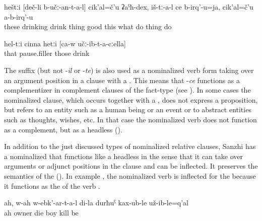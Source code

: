 \begin{exe}
	\ex	\label{ex:‎The ones who are drinking, what good things do they do, they do not do anything (good)}
	\gll	heštːi	[deč-li	b-učː-an-t-a-l]	cik'al=č'u	ʡaˁħ-dex,	iš-tː-a-l	ce	b-irq'-u=ja,		cik'al=č'u	a-b-irq'-u\\
		these	drinking	drink	thing	good	this	what	do	thing	do\\
	\glt	{}

	\ex	\label{ex:these, hm, with whom (he) himself was drinking}
	\gll	hel-tːi	cinna	hetːi	[ca-w	učː-ib-t-a-cːella]\\
		that	pause.filler	those		drink\\
	\glt	{}
\end{exe}

The suffix  (but not -\textit{il} or -\textit{te}) is also used as a nominalized verb form taking over an argument position in a clause with a . This means that -\textit{ce} functions as a complementizer in complement clauses of the fact-type (see ). In some cases the nominalized clause, which occurs together with a , does not express a proposition, but refers to an entity such as a human being or an event or to abstract entities such as thoughts, wishes, etc. In that case the nominalized verb does not function as a complement, but as a headless  ().

In addition to the just discussed types of nominalized relative clauses, Sanzhi has a nominalized  that functions like a headless  in the sense that it can take over arguments or adjunct positions in the clause and can be inflected. It preserves the semantics of the  (). In example , the nominalized verb   is inflected for the  because it functions as the  of the verb  .

\begin{exe}
	\ex	\label{ex:Ah, the ones who have one beloved (i.e. the owners), who have apparently killed my son, may they die}
	\gll	ah,	w-ah	w-ebk'-ar-t-a-l	di-la	durħuˁ	kax-ub-le	už-ib-le=q'al\\
		ah	owner	die		boy	kill	be\\
	\glt	{}
\end{exe}

